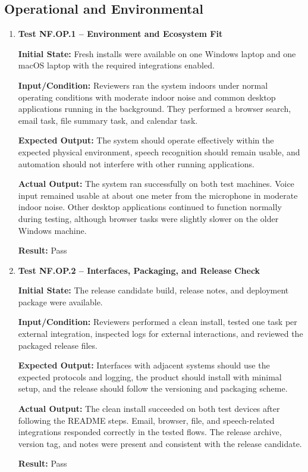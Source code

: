 \documentclass[12pt]{article}
\begin{document}
\subsection{Operational and Environmental}

\begin{enumerate}
    \item \textbf{Test NF.OP.1 -- Environment and Ecosystem Fit}
    
    \textbf{Initial State:} Fresh installs were available on one
    Windows laptop and one macOS laptop with the required integrations
    enabled.
    
    \textbf{Input/Condition:} Reviewers ran the system indoors under
    normal operating conditions with moderate indoor noise and common
    desktop applications running in the background. They performed a
    browser search, email task, file summary task, and calendar task.
    
    \textbf{Expected Output:} The system should operate effectively
    within the expected physical environment, speech recognition should
    remain usable, and automation should not interfere with other
    running applications.
    
    \textbf{Actual Output:} The system ran successfully on both test
    machines. Voice input remained usable at about one meter from the
    microphone in moderate indoor noise. Other desktop applications
    continued to function normally during testing, although browser
    tasks were slightly slower on the older Windows machine.
    
    \textbf{Result:} Pass

    \item \textbf{Test NF.OP.2 -- Interfaces, Packaging, and Release}
    \textbf{Check}
    
    \textbf{Initial State:} The release candidate build, release
    notes, and deployment package were available.
    
    \textbf{Input/Condition:} Reviewers performed a clean install,
    tested one task per external integration, inspected logs for
    external interactions, and reviewed the packaged release files.
    
    \textbf{Expected Output:} Interfaces with adjacent systems should
    use the expected protocols and logging, the product should install
    with minimal setup, and the release should follow the versioning
    and packaging scheme.
    
    \textbf{Actual Output:} The clean install succeeded on both test
    devices after following the README steps. Email, browser, file, and
    speech-related integrations responded correctly in the tested
    flows. The release archive, version tag, and notes were present and
    consistent with the release candidate.
    
    \textbf{Result:} Pass
\end{enumerate}
\end{document}
